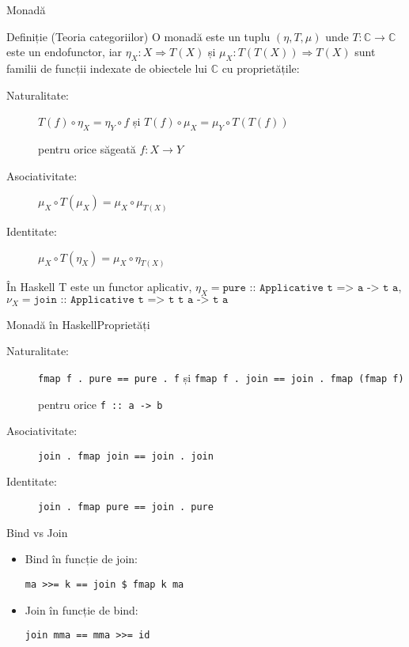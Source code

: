 \documentclass[xcolor=pdftex,romanian,colorlinks]{beamer}
\begin{document}
\begin{frame}{Monadă}
\begin{block}
{Definiție (Teoria categoriilor)}
O monadă este un tuplu $(\eta, T, \mu)$ unde $T : \mathbb{C} \rightarrow \mathbb{C}$ este un endofunctor, iar $\eta_X : X \Rightarrow T(X)$ și $\mu_X : T(T(X)) \Rightarrow T(X)$ sunt familii de funcții indexate de obiectele lui $\mathbb{C}$ cu proprietățile:
\begin{description}
\item[Naturalitate:] $T(f) \circ \eta_X = \eta_Y \circ f$
și $T(f)\circ \mu_X = \mu_Y \circ T(T(f))$

pentru orice săgeată $f : X \rightarrow Y$

\item[Asociativitate:] $\mu_X \circ T(\mu_X) = \mu_X \circ \mu_{T(X)}$

\item[Identitate:] $ \mu_X \circ T(\eta_X) = \mu_X\circ \eta_{T(X)}$

\end{description}
\end{block}

\begin{block}{În Haskell T este un functor aplicativ, $\eta_X = \texttt{pure :: Applicative t => a -> t a}$, $\nu_X = \texttt{join :: Applicative t => t t a -> t a} $}
\end{block}
\end{frame}


\begin{frame}{Monadă în Haskell}{Proprietăți}
\begin{description}
\item[Naturalitate:] \lstinline$fmap f . pure == pure . f$
și \lstinline$fmap f . join == join . fmap (fmap f)$

pentru orice \lstinline$f :: a -> b$

\item[Asociativitate:] \lstinline$join . fmap join == join . join$

\item[Identitate:] \lstinline$join . fmap pure == join . pure$
\end{description}

\begin{block}{Bind vs Join}
\begin{itemize}

\item Bind în funcție de join:

 \lstinline"ma >>= k == join $ fmap k ma"

\item Join în funcție de bind:

 \lstinline$join mma == mma >>= id$

\end{itemize}
\end{block}
\end{frame}
\end{document}
